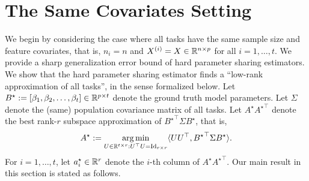 \section{The Same Covariates Setting}\label{sec_same}

We begin by considering the case where all tasks have the same sample size and feature covariates, that is, $n_i = n$ and $X^{(i)} = X\in\mathbb{R}^{n\times p}$ for all $i = 1, \dots, t$.
We provide a sharp generalization error bound of hard parameter sharing estimators.
We show that the hard parameter sharing estimator finds a ``low-rank approximation of all tasks'', in the sense formalized below.
Let $B^\star := [{\beta}_1,{\beta}_2,\dots,{\beta}_{t}] \in \mathbb{R}^{p\times t}$ denote the ground truth model parameters.
Let $\Sigma$ denote the (same) population covariance matrix of all tasks.
Let $A^{\star} {A^{\star}}^{\top}$ denote the best rank-$r$ subspace approximation of ${B^{\star}}^\top\Sigma B^{\star}$, that is,
\[ A^{\star} := \operatorname*{arg\,min}_{U\in\mathbb{R}^{t\times r} : U^{\top} U = \operatorname{Id}_{r\times r}} \langle U U^{\top}, {B^{\star}}^{\top} \Sigma B^{\star} \rangle. \]
For $i = 1,\dots, t$, let $a_i^{\star} \in\mathbb{R}^r$ denote the $i$-th column of $A^{\star}{A^{\star}}^{\top}$.
Our main result in this section is stated as follows.

